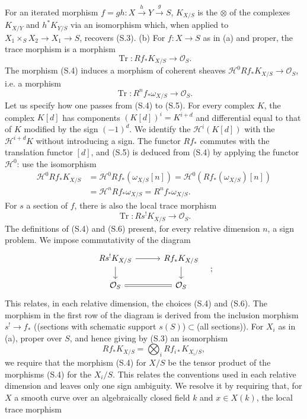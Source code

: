 \documentclass[11pt,leqno]{article}
\DeclareMathOperator{\Tr}{Tr}
\newcommand{\OO}{\mathcal O}
\begin{document}
For an iterated morphism $f=gh:X\xrightarrow{h}Y\xrightarrow{g}S$, $K_{X/S}$ is the $\otimes$ of the complexes $K_{X/Y}$ and $h^*K_{Y/S}$ via an isomorphism which, when applied to $X_1\times_SX_2\to X_1\to S$, recovers (S.3).
\clearpage
\noindent (b) For $f:X\to S$ as in (a) and proper, the trace morphism is a morphism
\begin{equation}
        \Tr:Rf_*K_{X/S}\longrightarrow\OO_S. \tag{S.4}
\end{equation}
The morphism (S.4) induces a morphism of coherent sheaves $\mathcal H^0Rf_*K_{X/S}\to\OO_S$, i.e. a morphism
\begin{equation}
        \Tr:R^nf_*\omega_{X/S}\longrightarrow\OO_S. \tag{S.5}
\end{equation}
Let us specify how one passes from (S.4) to (S.5). For every complex $K$, the complex $K[d]$ has components $(K[d])^i=K^{i+d}$ and differential equal to that of $K$ modified by the sign $(-1)^d$. We identify the $\mathcal H^i(K[d])$ with the $\mathcal H^{i+d}K$ without introducing a sign. The functor $Rf_*$ commutes with the translation functor $[d]$, and (S.5) is deduced from (S.4) by applying the functor $\mathcal H^0$: use the isomorphism
\[
\begin{aligned}
\mathcal H^0Rf_*K_{X/S}
&=\mathcal H^0Rf_*(\omega_{X/S}[n])
 =\mathcal H^0(Rf_*(\omega_{X/S})[n])\\
&=\mathcal H^nRf_*\omega_{X/S}=R^nf_*\omega_{X/S}.
\end{aligned}
\]
For $s$ a section of $f$, there is also the local trace morphism
\begin{equation}
        \Tr:Rs^!K_{X/S}\longrightarrow\OO_S. \tag{S.6}
\end{equation}
The definitions of (S.4) and (S.6) present, for every relative dimension $n$, a sign problem. We impose commutativity of the diagram
\[
\begin{tikzcd}[column sep=3em,row sep=1.5em]
Rs^!K_{X/S} \arrow[r] \arrow[d] & Rf_*K_{X/S} \arrow[d] \\
\OO_S \arrow[r,equal] & \OO_S
\end{tikzcd}
\quad;
\]
This relates, in each relative dimension, the choices (S.4) and (S.6). The morphism in the first row of the diagram is derived from the inclusion morphism $s^!\to f_*$ ((sections with schematic support $s(S)$)$\subset$(all sections)). For $X_i$ as in (a), proper over $S$, and hence giving by (S.3) an isomorphism
\[
        Rf_*K_{X/S}=\bigotimes_i Rf_{i*}K_{X_i/S},
\]
we require that the morphism (S.4) for $X/S$ be the tensor product of the morphisms (S.4) for the $X_i/S$. This relates the conventions used in each relative dimension and leaves only one sign ambiguity. We resolve it by requiring that, for $X$ a smooth curve over an algebraically closed field $k$ and $x\in X(k)$, the local trace morphism
\end{document}
